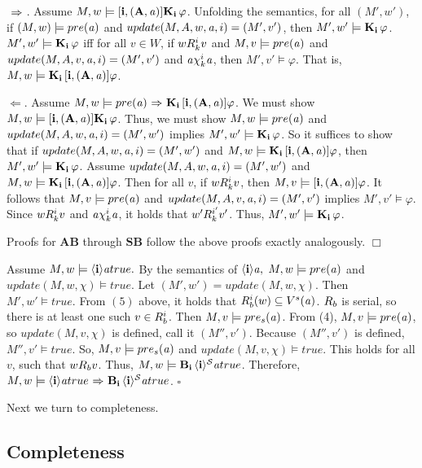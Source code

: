 ${\ \Rightarrow \ }$. Assume $M,w \models \mathbf{[i,(A,\mathit{a})]}\mathbf{K}_{\mathbf{i}}\,\varphi$. Unfolding the semantics, for all $(M',w')$, if $(M,w)\models pre(\mathit{a})$ and $update(M,A,w,\mathit{a},\\i)=(M',v')$, then $M',w'\models\mathbf{K}_{\mathbf{i}}\,\varphi$. $M',w'\models \mathbf{K}_{\mathbf{i}}\,\varphi$ iff for all $v\in W$, if $wR_{k}^iv$ and $M,v\models pre(\mathit{a})$ and $update(M,A,v,\mathit{a},i)=(M',v')$ and  $\mathit{a}\chi_{k}^i\mathit{a}$, then $M',v'\models\varphi$. That is, $M,w\models \mathbf{K}_{\mathbf{i}}\,\mathbf{[i,(A,\mathit{a})]}\varphi$. 

$\Leftarrow$. Assume $M,w \models pre(\mathit{a}) {\ \Rightarrow \ } \mathbf{K}_{\mathbf{i}}\,\mathbf{[i,(A,\mathit{a})]}\varphi$. We must show $M,w \models \mathbf{[i,(A,\mathit{a})]}\\\mathbf{K}_{\mathbf{i}}\,\varphi$. Thus, we must show $M,w \models pre(\mathit{a})$ and $update(M,A,w,\mathit{a},i)=(M',w')$ implies $M',w' \models \mathbf{K}_{\mathbf{i}}\,\varphi$. So it suffices to show that if $update(M,A,w,\mathit{a},i)=(M',w')$ and $M,w\models \mathbf{K}_{\mathbf{i}}\,\mathbf{[i,(A,\mathit{a})]}\varphi$, then $M',w'\models \mathbf{K}_{\mathbf{i}}\,\varphi$. Assume $update(M,A,w,\\\mathit{a},i)=(M',w')$ and $M,w\models\mathbf{K}_{\mathbf{i}}\,\mathbf{[i,(A,\mathit{a})]}\varphi$. Then for all $v$, if $wR_{k}^iv$, then $M,v\models\mathbf{[i,(A,\mathit{a})]}\varphi$. It follows that $M,v\models pre(\mathit{a})$ and $update(M,A,v,\mathit{a},i)=(M',v')$ implies $M',v'\models\varphi$. Since $wR_{k}^iv$ and $\mathit{a}\chi_{k}^i\mathit{a}$, it holds that $w'R_{k}^{i'}v'$. Thus, $M',w'\models\mathbf{K}_{\mathbf{i}}\,\varphi$.

Proofs for $\mathbf{AB}$ through $\mathbf{SB}$ follow the above proofs exactly analogously. $\Box$ 

Assume $M,w \models \mathbf{\langle i\rangle}{\mathit{a}}true.$ By the semantics of $\mathbf{\langle i\rangle}{\mathit{a}},$ $M,w \models pre(\mathit{a})$ and $update(M,w,\chi)\models true$. Let $(M',w') = update(M,w,\chi)$. Then $M',w' \models true$. From $(5)$ above, it holds that $R_{b}^i (w) \subseteq V^s (\mathit{a})$. $R_{b}$ is serial, so there is at least one such $v \in R_{b}^i$. Then $M,v \models pre_s(\mathit{a})$. From (4), $M,v \models pre(\mathit{a})$, so $update(M,v,\chi)$ is defined, call it $(M'',v')$. Because $(M'',v')$ is defined, $M'',v' \models true$. So, $M,v \models pre_s(\mathit{a})$ and $update(M,v,\chi)\models true$. This holds for all $v$, such that $wR_{b}v$. Thus, $M,w \models \mathbf{B}_{\mathbf{i}}\,\mathbf{\langle i\rangle^\mathcal{S}}{\mathit{a}}true$. Therefore, $M,w \models \mathbf{\langle i\rangle}{\mathit{a}}true {\ \Rightarrow \ } \mathbf{B}_{\mathbf{i}}\,\mathbf{\langle i\rangle^\mathcal{S}}{\mathit{a}}true$. $\square$ 

Next we turn to completeness.

\subsection{Completeness}

